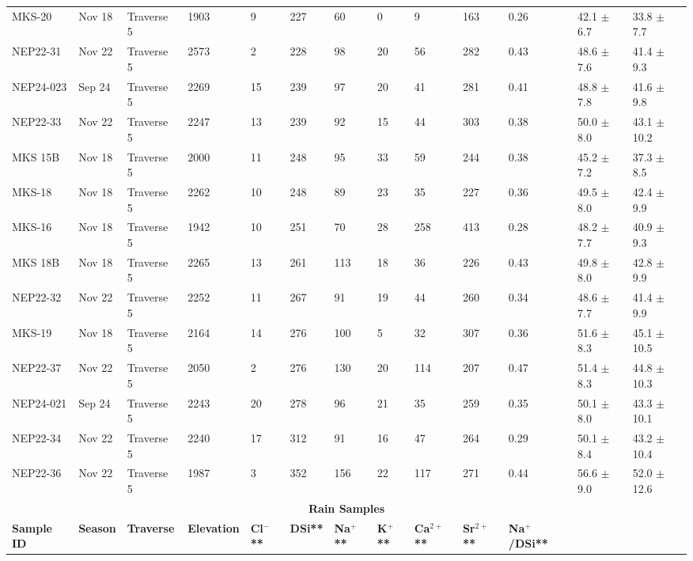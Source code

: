 \begin{landscape}
{\begin{longtable}{l l l l l l l l l l l l l}
    MKS-20 & Nov 18 & Traverse 5 & 1903 & 9 & 227 & 60 & 0 & 9 & 163 & 0.26 & 42.1 $\pm$ 6.7 & 33.8 $\pm$ 7.7 \\
    NEP22-31 & Nov 22 & Traverse 5 & 2573 & 2 & 228 & 98 & 20 & 56 & 282 & 0.43 & 48.6 $\pm$ 7.6 & 41.4 $\pm$ 9.3 \\
    NEP24-023 & Sep 24 & Traverse 5 & 2269 & 15 & 239 & 97 & 20 & 41 & 281 & 0.41 & 48.8 $\pm$ 7.8 & 41.6 $\pm$ 9.8 \\
    NEP22-33 & Nov 22 & Traverse 5 & 2247 & 13 & 239 & 92 & 15 & 44 & 303 & 0.38 & 50.0 $\pm$ 8.0 & 43.1 $\pm$ 10.2 \\
    MKS 15B & Nov 18 & Traverse 5 & 2000 & 11 & 248 & 95 & 33 & 59 & 244 & 0.38 & 45.2 $\pm$ 7.2 & 37.3 $\pm$ 8.5 \\
    MKS-18 & Nov 18 & Traverse 5 & 2262 & 10 & 248 & 89 & 23 & 35 & 227 & 0.36 & 49.5 $\pm$ 8.0 & 42.4 $\pm$ 9.9 \\
    MKS-16 & Nov 18 & Traverse 5 & 1942 & 10 & 251 & 70 & 28 & 258 & 413 & 0.28 & 48.2 $\pm$ 7.7 & 40.9 $\pm$ 9.3 \\
    MKS 18B & Nov 18 & Traverse 5 & 2265 & 13 & 261 & 113 & 18 & 36 & 226 & 0.43 & 49.8 $\pm$ 8.0 & 42.8 $\pm$ 9.9 \\
    NEP22-32 & Nov 22 & Traverse 5 & 2252 & 11 & 267 & 91 & 19 & 44 & 260 & 0.34 & 48.6 $\pm$ 7.7 & 41.4 $\pm$ 9.9 \\
    MKS-19 & Nov 18 & Traverse 5 & 2164 & 14 & 276 & 100 & 5 & 32 & 307 & 0.36 & 51.6 $\pm$ 8.3 & 45.1 $\pm$ 10.5 \\
    NEP22-37 & Nov 22 & Traverse 5 & 2050 & 2 & 276 & 130 & 20 & 114 & 207 & 0.47 & 51.4 $\pm$ 8.3 & 44.8 $\pm$ 10.3 \\
    NEP24-021 & Sep 24 & Traverse 5 & 2243 & 20 & 278 & 96 & 21 & 35 & 259 & 0.35 & 50.1 $\pm$ 8.0 & 43.3 $\pm$ 10.1 \\
    NEP22-34 & Nov 22 & Traverse 5 & 2240 & 17 & 312 & 91 & 16 & 47 & 264 & 0.29 & 50.1 $\pm$ 8.4 & 43.2 $\pm$ 10.4 \\
    NEP22-36 & Nov 22 & Traverse 5 & 1987 & 3 & 352 & 156 & 22 & 117 & 271 & 0.44 & 56.6 $\pm$ 9.0 & 52.0 $\pm$ 12.6 \\
    \hline
    \hline
    \multicolumn{13}{c}{\textbf{Rain Samples}} \\
    \hline
    \textbf{Sample ID}  &  \textbf{Season}  &  \textbf{Traverse}  &  \textbf{Elevation}  &  \textbf{Cl$^-$**}  &  \textbf{DSi**}  &  \textbf{Na$^{+}$**}  &  \textbf{K$^{+}$**}  &  \textbf{Ca$^{2+}$**}  &  \textbf{Sr$^{2+}$**}  &  \textbf{Na$^{+}$/DSi**}  &  \phantom{T$_{Fontorbe} \pm 1\sigma$}  &  \phantom{T$_{Maher} \pm 1\sigma$} \\

\end{longtable}}
\end{landscape}
